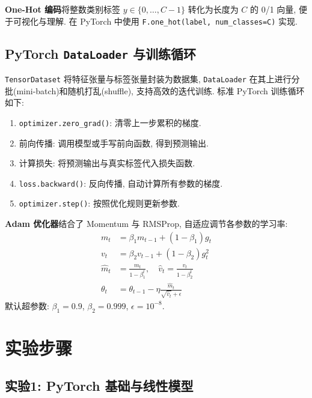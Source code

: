 \documentclass{../../nndlcourse}
\begin{document}
\textbf{One-Hot 编码}将整数类别标签 $y \in \{0, \ldots, C-1\}$ 转化为长度为 $C$ 的 0/1 向量, 便于可视化与理解. 在 PyTorch 中使用 \texttt{F.one\_hot(label, num\_classes=C)} 实现.

\subsection{PyTorch \texttt{DataLoader} 与训练循环}

\texttt{TensorDataset} 将特征张量与标签张量封装为数据集, \texttt{DataLoader} 在其上进行分批(mini-batch)和随机打乱(shuffle), 支持高效的迭代训练. 标准 PyTorch 训练循环如下: 

\begin{enumerate}
    \item \texttt{optimizer.zero\_grad()}: 清零上一步累积的梯度.
    \item 前向传播: 调用模型或手写前向函数, 得到预测输出.
    \item 计算损失: 将预测输出与真实标签代入损失函数.
    \item \texttt{loss.backward()}: 反向传播, 自动计算所有参数的梯度.
    \item \texttt{optimizer.step()}: 按照优化规则更新参数.
\end{enumerate}

\textbf{Adam 优化器}结合了 Momentum 与 RMSProp, 自适应调节各参数的学习率: 
\begin{align}
    m_t &= \beta_1 m_{t-1} + (1-\beta_1)g_t \\
    v_t &= \beta_2 v_{t-1} + (1-\beta_2)g_t^2 \\
    \hat{m}_t &= \frac{m_t}{1-\beta_1^t}, \quad \hat{v}_t = \frac{v_t}{1-\beta_2^t} \\
    \theta_t &= \theta_{t-1} - \eta\frac{\hat{m}_t}{\sqrt{\hat{v}_t}+\epsilon}
\end{align}
默认超参数: $\beta_1=0.9$, $\beta_2=0.999$, $\epsilon=10^{-8}$.



\section{实验步骤}

\subsection*{实验1: PyTorch 基础与线性模型}
\end{document}
